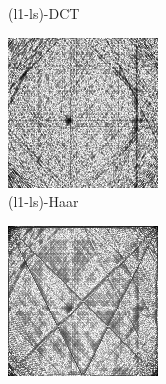 \documentclass[journal]{IEEEtran}
\begin{document}
\begin{figure}[!h]
\begin{subfigure}[b]{0.24\linewidth}
        \caption{(l1-ls)-DCT}
     \end{subfigure}
    \begin{subfigure}[b]{0.24\linewidth}
        \includegraphics[width=\textwidth]{../images/potato/post_tci/comparison/weightsIm_cs_wavelet30.png}
        \caption{(l1-ls)-Haar}
     \end{subfigure}
    \begin{subfigure}[b]{0.24\linewidth}
        \includegraphics[width=\textwidth]{../images/potato/post_tci/comparison/weightsIm_art30.png}

\end{subfigure}
\end{figure}
\end{document}
